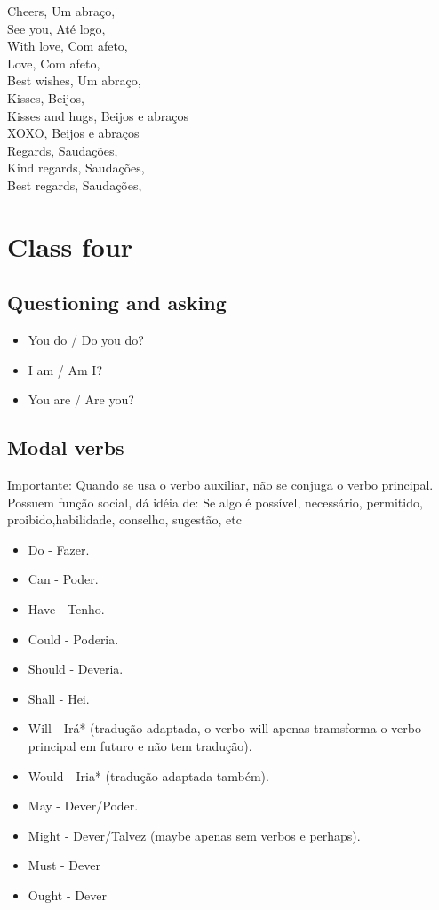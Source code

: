 \documentclass[12pt,a4paper]{article} %
\begin{document}
\begin{itemize}
Cheers, 	Um abraço,\\
See you, 	Até logo,\\
With love, 	Com afeto,\\
Love, 	Com afeto,\\
Best wishes, 	Um abraço,\\
Kisses, 	Beijos,\\
Kisses and hugs, 	Beijos e abraços\\
XOXO, 	Beijos e abraços\\
Regards, 	Saudações,\\
Kind regards, 	Saudações,\\
Best regards, 	Saudações,\\
\end{itemize}
\section{Class four}
\subsection{Questioning and asking}
\begin{itemize}
\item You do / Do you do?
\item I am / Am I?
\item You are / Are you?
\end{itemize}
\subsection{Modal verbs}
Importante: Quando se usa o verbo auxiliar, não se conjuga o verbo principal.\\
Possuem função social, dá idéia de: Se algo é possível, necessário, permitido, proibido,habilidade, conselho, sugestão, etc
\begin{itemize}
\item Do - Fazer.
\item Can - Poder.
\item Have - Tenho.
\item Could - Poderia.
\item Should - Deveria.
\item Shall - Hei.
\item Will - Irá* (tradução adaptada, o verbo will apenas tramsforma o verbo principal em futuro e não tem tradução).
\item Would - Iria* (tradução adaptada também).
\item May - Dever/Poder.
\item Might - Dever/Talvez (maybe apenas sem verbos e perhaps).
\item Must - Dever
\item Ought - Dever
\end{itemize}
\end{document}
